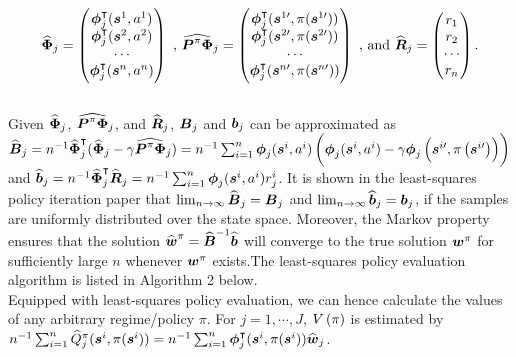$$\widehat{\boldsymbol{\Phi}}_j = \begin{pmatrix}
\boldsymbol{\phi}_j^\intercal(\boldsymbol{s}^1,a^1)  \\
\boldsymbol{\phi}_j^\intercal(\boldsymbol{s}^2,a^2) \\
\cdots\\
\boldsymbol{\phi}_j^\intercal(\boldsymbol{s}^n,a^n) \end{pmatrix}
\text{ , } 
\widehat{\boldsymbol{P}^{\pi}\boldsymbol{\Phi}}_j = \begin{pmatrix}
\boldsymbol{\phi}_j^\intercal(\boldsymbol{s}^{1\prime},\pi(\boldsymbol{s}^{1\prime})) \\
\boldsymbol{\phi}_j^\intercal(\boldsymbol{s}^{2\prime},\pi(\boldsymbol{s}^{2\prime})) \\
\cdots\\
\boldsymbol{\phi}_j^\intercal(\boldsymbol{s}^{n\prime},\pi(\boldsymbol{s}^{n\prime})) \end{pmatrix} 
\text{ , and }
\widehat{\boldsymbol{R}}_j=  \begin{pmatrix} r_1 \\
r_2 \\
\cdots \\
r_n\end{pmatrix}.$$
\\
Given $\widehat{\boldsymbol{\Phi}}_j$, $\widehat{\boldsymbol{P}^{\pi}\boldsymbol{\Phi}}_j$, and $\widehat{\boldsymbol{R}}_j$, $\boldsymbol{B}_j$ and $\boldsymbol{b}_j$ can be approximated as
$\widehat{\boldsymbol{B}}_j = n^{-1}\widehat{\boldsymbol{\Phi}}_j^{\intercal}(\widehat{\boldsymbol{\Phi}}_j - \gamma \widehat{\boldsymbol{P}^{\pi}\boldsymbol{\Phi}}_j ) =  n^{-1}\sum_{i =1}^n  \boldsymbol{\phi}_j(\boldsymbol{s}^i,a^i) \left( \boldsymbol{\phi}_j(\boldsymbol{s}^i,a^i) - \gamma \boldsymbol{\phi}_j\left(\boldsymbol{s}^{i\prime},\pi\left(\boldsymbol{s}^{i\prime}\right)\right)\right)$ and $\widehat{\boldsymbol{b}}_j =n^{-1}\widehat{\boldsymbol{\Phi}}_j^{\intercal} \widehat{\boldsymbol{R}}_j= n^{-1}\sum_{i=1}^n \boldsymbol{\phi}_j(\boldsymbol{s}^i, a^i) r^i_j$. It is shown in the least-squares policy iteration paper that $\lim_{n \to \infty}\widehat{\boldsymbol{B}}_j = \boldsymbol{B}_j$ and $\lim_{n \to \infty}\widehat{\boldsymbol{b}}_j = \boldsymbol{b}_j$, if the samples are uniformly distributed over the state space. Moreover, the Markov property ensures that the solution $\widehat{\boldsymbol{w}}^{\pi} = \widehat{\boldsymbol{B}}^{-1}\widehat{\boldsymbol{b}}$ will converge to the true solution $\boldsymbol{w}^{\pi}$ for sufficiently large $n$  whenever  $\boldsymbol{w}^{\pi}$  exists\cite{Lagoudakis2003,Lagoudakis2001}.The least-squares policy evaluation algorithm is listed in Algorithm 2 below.\\

Equipped with least-squares policy evaluation, we can hence calculate the values of any arbitrary regime/policy $\pi$. For $j = 1, \cdots, J$, $V\left({\pi}\right)$ is estimated by $n^{-1}\sum_{i=1}^{n} \widehat{Q}^{\pi}_j(\boldsymbol{s}^i, \pi(\boldsymbol{s}^i)) = n^{-1}\sum_{i=1}^n\boldsymbol{\phi}_j^{\intercal}(\boldsymbol{s}^i,\pi(\boldsymbol{s}^{i}))\widehat{\boldsymbol{w}}_j $.



